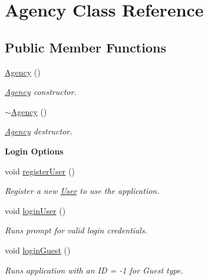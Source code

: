 \hypertarget{class_agency}{}\section{Agency Class Reference}
\label{class_agency}
\subsection*{Public Member Functions}
\begin{DoxyCompactItemize}
\item 
\hyperlink{group___agency_gaf6fc6c4dec00025fce567183f67edbaa}{Agency} ()
\begin{DoxyCompactList}\small\item\em \hyperlink{class_agency}{Agency} constructor. \end{DoxyCompactList}\item 
\hyperlink{group___agency_ga922750a7051987df9bb697769fdf0256}{$\sim$\+Agency} ()
\begin{DoxyCompactList}\small\item\em \hyperlink{class_agency}{Agency} destructor. \end{DoxyCompactList}\end{DoxyCompactItemize}
\begin{Indent}\textbf{ Login Options}\par
\begin{DoxyCompactItemize}
\item 
void \hyperlink{group___agency_ga75a16a58bcbc705df50e89531f513c49}{register\+User} ()
\begin{DoxyCompactList}\small\item\em Register a new \hyperlink{class_user}{User} to use the application. \end{DoxyCompactList}\item 
void \hyperlink{group___agency_gae4523bdce3f7af3a2be444c4a2ae0630}{login\+User} ()
\begin{DoxyCompactList}\small\item\em Runs prompt for valid login credentials. \end{DoxyCompactList}\item 
void \hyperlink{group___agency_gaddfd587d88999314b59aab8be6438271}{login\+Guest} ()
\begin{DoxyCompactList}\small\item\em Runs application with an ID = -\/1 for Guest type. \end{DoxyCompactList}\end{DoxyCompactItemize}
\end{Indent}
